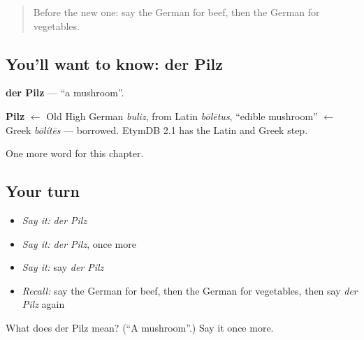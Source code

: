 \begin{quote}
Before the new one: say the German for beef, then the German for vegetables.
\end{quote}

\subsection*{You'll want to know: der Pilz}
\textbf{der Pilz} — \textquotedblleft{}a mushroom\textquotedblright{}.

\begin{cousinweb}
\textbf{Pilz} $\leftarrow$ Old High German \emph{buliz}, from Latin \emph{bōlētus}, \textquotedblleft{}edible mushroom\textquotedblright{} $\leftarrow$ Greek \emph{bōlítēs} — borrowed. EtymDB 2.1 has the Latin and Greek step.
\end{cousinweb}

\begin{grammarlens}[title={What you've built}]
One more word for this chapter.
\end{grammarlens}

\subsection*{Your turn}
\begin{itemize}
\raggedright
  \item \emph{Say it:} \emph{der Pilz}
  \item \emph{Say it:} \emph{der Pilz}, once more
  \item \emph{Say it:} say \emph{der Pilz}
  \item \emph{Recall:} say the German for beef, then the German for vegetables, then say \emph{der Pilz} again
\end{itemize}

\begin{tcolorbox}[breakable,colback=teal!4,colframe=teal!35!black,title={Before you move on}]
What does der Pilz mean? (\textquotedblleft{}A mushroom\textquotedblright{}.) Say it once more.
\end{tcolorbox}
